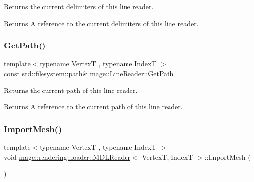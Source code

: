 Returns the current delimiters of this line reader.

\begin{DoxyReturn}{Returns}
A reference to the current delimiters of this line reader. 
\end{DoxyReturn}
\mbox{\label{classmage_1_1rendering_1_1loader_1_1_m_d_l_reader_a9740b3cecdcf5a27c696a08eef3b09da}} 
\subsubsection{\texorpdfstring{Get\+Path()}{GetPath()}}
{\footnotesize\ttfamily template$<$typename VertexT , typename IndexT $>$ \\
const std\+::filesystem\+::path\& mage\+::\+Line\+Reader\+::\+Get\+Path\hspace{0.3cm}{\ttfamily [noexcept]}}

Returns the current path of this line reader.

\begin{DoxyReturn}{Returns}
A reference to the current path of this line reader. 
\end{DoxyReturn}
\mbox{\label{classmage_1_1rendering_1_1loader_1_1_m_d_l_reader_a512618ed9e79671dbcb468d155272b7e}} 
\subsubsection{\texorpdfstring{Import\+Mesh()}{ImportMesh()}}
{\footnotesize\ttfamily template$<$typename VertexT , typename IndexT $>$ \\
void \mbox{\hyperlink{classmage_1_1rendering_1_1loader_1_1_m_d_l_reader}{mage\+::rendering\+::loader\+::\+M\+D\+L\+Reader}}$<$ VertexT, IndexT $>$\+::Import\+Mesh (\begin{DoxyParamCaption}{ }\end{DoxyParamCaption})\hspace{0.3cm}{\ttfamily [private]}}

